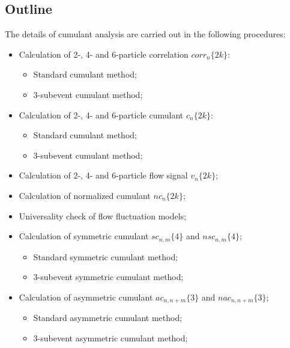 \subsection{Outline}
The details of cumulant analysis are carried out in the following procedures:
\begin{itemize}
\item Calculation of 2-, 4- and 6-particle correlation $corr_n\{2k\}$:
\begin{itemize}
\item Standard cumulant method;
\item 3-subevent cumulant method;
\end{itemize}
\item Calculation of 2-, 4- and 6-particle cumulant $c_n\{2k\}$:
\begin{itemize}
\item Standard cumulant method;
\item 3-subevent cumulant method;
\end{itemize}
\item Calculation of 2-, 4- and 6-particle flow signal $v_n\{2k\}$;
\item Calculation of normalized cumulant $nc_n\{2k\}$;
\item Universality check of flow fluctuation models;
\item Calculation of symmetric cumulant $sc_{n,m}\{4\}$ and $nsc_{n,m}\{4\}$;
\begin{itemize}
\item Standard symmetric cumulant method;
\item 3-subevent symmetric cumulant method;
\end{itemize}
\item Calculation of asymmetric cumulant $ac_{n,n+m}\{3\}$ and $nac_{n,n+m}\{3\}$;
\begin{itemize}
\item Standard asymmetric cumulant method;
\item 3-subevent asymmetric cumulant method;
\end{itemize}
\end{itemize}



